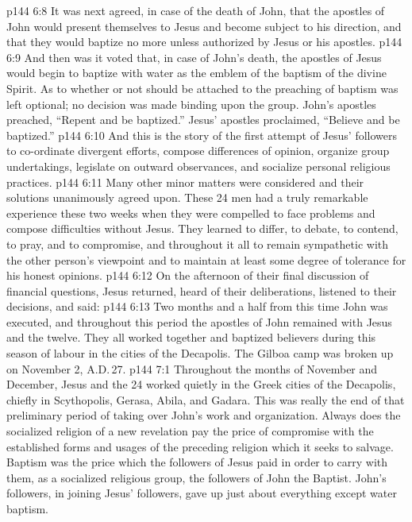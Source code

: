 \vs p144 6:8 It was next agreed, in case of the death of John, that the apostles of John would present themselves to Jesus and become subject to his direction, and that they would baptize no more unless authorized by Jesus or his apostles.
\vs p144 6:9 And then was it voted that, in case of John’s death, the apostles of Jesus would begin to baptize with water as the emblem of the baptism of the divine Spirit. As to whether or not  should be attached to the preaching of baptism was left optional; no decision was made binding upon the group. John’s apostles preached, “Repent and be baptized.” Jesus’ apostles proclaimed, “Believe and be baptized.”
\vs p144 6:10 \pc And this is the story of the first attempt of Jesus’ followers to co\hyp{}ordinate divergent efforts, compose differences of opinion, organize group undertakings, legislate on outward observances, and socialize personal religious practices.
\vs p144 6:11 Many other minor matters were considered and their solutions unanimously agreed upon. These 24 men had a truly remarkable experience these two weeks when they were compelled to face problems and compose difficulties without Jesus. They learned to differ, to debate, to contend, to pray, and to compromise, and throughout it all to remain sympathetic with the other person’s viewpoint and to maintain at least some degree of tolerance for his honest opinions.
\vs p144 6:12 \pc On the afternoon of their final discussion of financial questions, Jesus returned, heard of their deliberations, listened to their decisions, and said: 
\vs p144 6:13 \pc Two months and a half from this time John was executed, and throughout this period the apostles of John remained with Jesus and the twelve. They all worked together and baptized believers during this season of labour in the cities of the Decapolis. The Gilboa camp was broken up on November 2, A.D.\,27.
\vs p144 7:1 Throughout the months of November and December, Jesus and the 24 worked quietly in the Greek cities of the Decapolis, chiefly in Scythopolis, Gerasa, Abila, and Gadara. This was really the end of that preliminary period of taking over John’s work and organization. Always does the socialized religion of a new revelation pay the price of compromise with the established forms and usages of the preceding religion which it seeks to salvage. Baptism was the price which the followers of Jesus paid in order to carry with them, as a socialized religious group, the followers of John the Baptist. John’s followers, in joining Jesus’ followers, gave up just about everything except water baptism.
